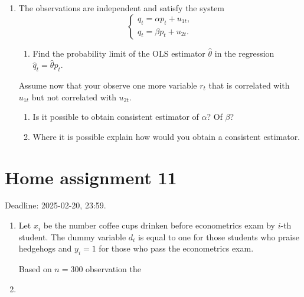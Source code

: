 \documentclass[12pt]{article}
\begin{document}
\begin{enumerate}

\item The observations are independent and satisfy the system 
\[
\begin{cases}
    q_t = \alpha p_t + u_{1t}, \\
    q_t = \beta p_t + u_{2t}.
\end{cases}
\]
\begin{enumerate}
    \item Find the probability limit of the OLS estimator $\hat \theta$ in the regression $\hat q_t = \hat\theta p_t$.
\end{enumerate}
Assume now that your observe one more variable $r_t$ that is correlated with $u_{1t}$ but not correlated with $u_{2t}$.
\begin{enumerate}[resume]
    \item Is it possible to obtain consistent estimator of $\alpha$? Of $\beta$?
    \item Where it is possible explain how would you obtain a consistent estimator.
\end{enumerate}

\end{enumerate}


\section*{Home assignment 11}

Deadline: 2025-02-20, 23:59.

\begin{enumerate}
\item Let $x_i$ be the number coffee cups drinken before econometrics exam by $i$-th student. 
The dummy variable $d_i$ is equal to one for those students who praise hedgehogs and $y_i = 1$ for those who pass the econometrics exam. 

Based on $n=300$ observation the 


\item 
\end{enumerate}
\end{document}
